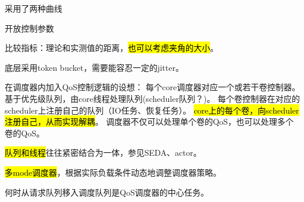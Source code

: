 采用了两种曲线

开放控制参数

比较指标：理论和实测值的距离，\hl{也可以考虑夹角的大小}。

底层采用token bucket，需要能容忍一定的jitter。

在调度器内加入QoS控制逻辑的设想： 每个core调度器对应一个或若干卷控制器。基于优先级队列，由core线程处理队列(scheduler队列？)。
每个卷控制器在对应的scheduler上注册自己的队列（IO任务、恢复任务）。 \hl{core上的每个卷，向scheduler注册自己，从而实现解耦}。
调度器不仅可以处理单个卷的QoS，也可以处理多个卷的QoS。

\hl{队列和线程}往往紧密结合为一体，参见SEDA、actor。

\hl{多mode调度器}，根据实际负载条件动态地调整调度器策略。

何时从请求队列移入调度队列是QoS调度器的中心任务。

